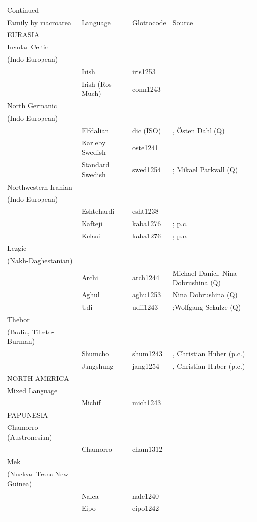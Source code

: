 \documentclass[output=collectionpaper]{langsci/langscibook}
\begin{document}
  \begin{table}[h!]
\scriptsize
 \begin{tabular}{llll} %
 Continued &&&\\
  \lsptoprule
 Family by macroarea &Language&Glottocode & Source\\
\midrule
EURASIA &&&\\
\midrule
Insular Celtic &&&\\
(Indo-European) && &\\
& Irish&iris1253 & \citet{Frenda2011}\\
& Irish (Ros Much)&conn1243 & \citet{Frenda2011}\\
\midrule
North Germanic &&&\\
(Indo-European)&&&\\
&Elfdalian& dic (ISO)& \citet{AAkerberg2012}, \"Osten Dahl (Q)\\
&Karleby Swedish &oste1241& \citet{Hultman1894,Hulden1972}\\
&Standard Swedish&swed1254&\citet{Duke2010}; Mikael Parkvall (Q)\\
\midrule
Northwestern Iranian && &\\
(Indo-European)&& &\\
& Eshtehardi&esht1238& \citet{Stilotoappear,Yarshater1969}\\
&Kafteji&kaba1276& \citet{Stilotoappear}; p.c. \\
&Kelasi&kaba1276& \citet{Stilotoappear}; p.c. \\
\midrule
Lezgic &&&\\
(Nakh-Daghestanian)&&&\\
&Archi&  arch1244 & Michael Daniel, Nina Dobrushina (Q) \\
&Aghul&aghu1253& Nina Dobrushina (Q)\\
& Udi& udii1243& \citet{Nichols2003};Wolfgang Schulze (Q)\\
\midrule
Thebor &&&\\
(Bodic, Tibeto-Burman)&&&\\
& Shumcho& shum1243& \citet{Huber2011}, Christian Huber (p.c.)\\
& Jangshung&jang1254& \citet{Huber2011}, Christian Huber (p.c.)\\
\midrule
NORTH AMERICA&&&\\
\midrule
Mixed Language &&&\\
& Michif&mich1243&\citet{Bakker1997}\\
\midrule
PAPUNESIA &&&\\
\midrule
Chamorro (Austronesian) &&& \\
&Chamorro&cham1312 &\citet{Stolz2012}\\
\midrule
Mek &&&\\
(Nuclear-Trans-New-Guinea) &&& \\
&Nalca&nalc1240 & \citet{Waelchli2018}\\
&Eipo&eipo1242& \citet{Waelchli2018}\\
 \lspbottomrule
 \end{tabular}
 \end{table}




\label{lastpage:DiGarboMiestamo}
\end{document}

